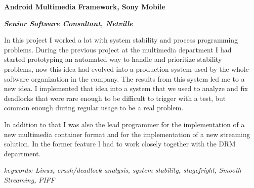 \item[2011-2012] \textbf{Android Multimedia Framework, Sony Mobile}

\textit{\textbf{Senior Software Consultant, Netville}}

In this project I worked a lot with system stability and process programming problems. During the previous project at the multimedia department I had started prototyping an automated way to handle and prioritize stability problems, now this idea had evolved into a production system used by the whole software organization in the company. The results from this system led me to a new idea. I implemented that idea into a system that we used to analyze and fix deadlocks that were rare enough to be difficult to trigger with a test, but common enough during regular usage to be a real problem.

In addition to that I was also the lead programmer for the implementation of a new multimedia container format and for the implementation of a new streaming solution. In the former feature I had to work closely together with the DRM department.

\textit{keywords: Linux, crash/deadlock analysis, system stability, stagefright, Smooth Streaming, PIFF}
